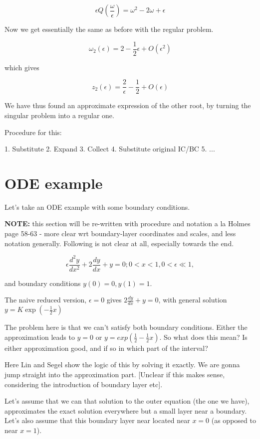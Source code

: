 \documentclass[12pt]{report}
\begin{document}
$$\epsilon Q(\frac \omega \epsilon) = \omega^2 - 2\omega + \epsilon$$

Now we get essentially the same as before with the regular problem.

$$\omega_2(\epsilon) = 2 - \frac 1 2 \epsilon + O(\epsilon^2)$$

which gives

$$z_2(\epsilon) = \frac 2 \epsilon - \frac 1 2 + O(\epsilon)$$

We have thus found an approximate expression of the other root, by turning the
singular problem into a regular one.

Procedure for this:

1. Substitute
2. Expand
3. Collect
4. Substitute original IC/BC
5. ...

\section{ODE example}

Let's take an ODE example with some boundary conditions.

\textbf{NOTE:} this section will be re-written with procedure and notation a la
Holmes page 58-63 - more clear wrt boundary-layer coordinates and scales, and
less notation generally. Following is not clear at all, especially towards the
end.

\begin{equation}
    \epsilon \frac{d^2y}{dx^2} + 2 \frac{dy}{dx} + y = 0; 0 < x < 1, 0 <
\epsilon \ll 1,
\end{equation}

and boundary conditions $y(0)=0, y(1) =1$.

The naive reduced version, $\epsilon = 0$ gives $2 \frac{dy}{dx} + y = 0$, with
general solution $y=K \exp(-\frac{1}{2} x)$

The problem here is that we can't satisfy both boundary conditions. Either the
approximation leads to $y=0$ or $y=exp(\frac 1 2 - \frac 1 2 x)$. So what does
this mean? Is either approximation good, and if so in which part of the
interval?

Here Lin and Segel show the logic of this by solving it exactly. We are gonna
jump straight into the approximation part. [Unclear if this makes sense,
considering the introduction of boundary layer etc].

Let's assume that we can that solution to the outer equation (the one we have),
approximates the exact solution everywhere but a small layer near a boundary.
Let's also assume that this boundary layer near located near $x=0$ (as opposed to near $x=1$).
\end{document}
